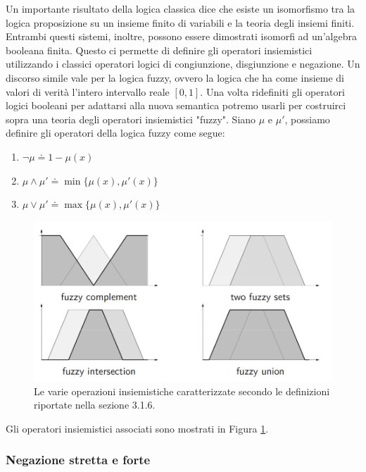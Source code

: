 \documentclass[10pt,a4paper]{article}
\begin{document}
Un importante risultato della logica classica dice che esiste un isomorfismo tra la logica proposizione su un insieme finito di variabili e la teoria degli insiemi finiti. Entrambi questi sistemi, inoltre, possono essere dimostrati isomorfi ad un'algebra booleana finita. Questo ci permette di definire gli operatori insiemistici utilizzando i classici operatori logici di congiunzione, disgiunzione e negazione. Un discorso simile vale per la logica fuzzy, ovvero la logica che ha come insieme di valori di verità l'intero intervallo reale $[0,1]$. Una volta ridefiniti gli operatori logici booleani per adattarsi alla nuova semantica potremo usarli per costruirci sopra una teoria degli operatori insiemistici "fuzzy". Siano $\mu$ e $\mu'$, possiamo definire gli operatori della logica fuzzy come segue:
\begin{enumerate}
\item{$\neg \mu \doteq 1 - \mu(x)$} 
\item{$\mu \wedge \mu' \doteq \min\{\mu(x),\mu'(x)\}$}
\item{$\mu \vee \mu' \doteq \max\{\mu(x),\mu'(x)\}$}
\end{enumerate}

\begin{figure}
\centering
\includegraphics[scale=0.3]{img/fuzzyop.png}
\caption{Le varie operazioni insiemistiche caratterizzate secondo le definizioni riportate nella sezione 3.1.6.}
\label{fig:26}
\end{figure}

Gli operatori insiemistici associati sono mostrati in Figura \ref{fig:26}.

\subsubsection{Negazione stretta e forte}
\end{document}
